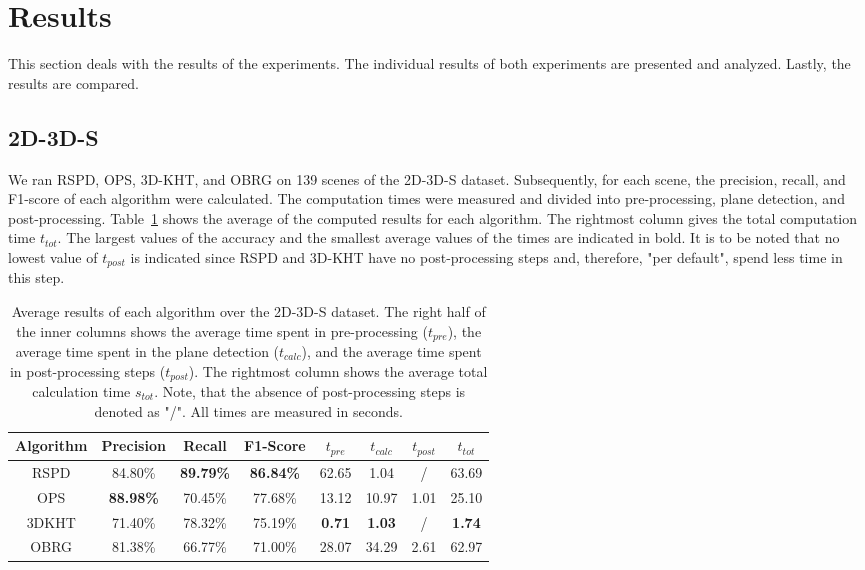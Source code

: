 \documentclass[main.tex]{subfiles}
\begin{document}
\section{Results}
This section deals with the results of the experiments.
The individual results of both experiments are presented and analyzed. Lastly, the results are compared.


\subsection{2D-3D-S}

We ran RSPD, OPS, 3D-KHT, and OBRG on 139 scenes of the 2D-3D-S dataset. Subsequently, for each scene, the precision, recall, and
F1-score of each algorithm were calculated. The computation times were measured and divided into pre-processing, plane detection,
and post-processing. Table~\ref{tab:res-3d2ds-total} shows the average of the computed results for each algorithm.
The rightmost column gives the total computation time $t_{tot}$. The largest values of the accuracy and the smallest average
values of the times are indicated in bold. It is to be noted that no lowest value of $t_{post}$ is indicated since RSPD and 3D-KHT
have no post-processing steps and, therefore, "per default", spend less time in this step.

\begin{table}[H]
    \centering
    \begin{tabular}{c|cccccc|c}
        Algorithm & Precision        & Recall           & F1-Score         & $t_{pre}$     & $t_{calc}$    & $t_{post}$ & $t_{tot}$     \\ \hline
        RSPD      & 84.80\%          & \textbf{89.79\%} & \textbf{86.84\%} & 62.65         & 1.04          & /          & 63.69         \\
        OPS       & \textbf{88.98\%} & 70.45\%          & 77.68\%          & 13.12         & 10.97         & 1.01       & 25.10         \\
        3DKHT     & 71.40\%          & 78.32\%          & 75.19\%          & \textbf{0.71} & \textbf{1.03} & /          & \textbf{1.74} \\
        OBRG      & 81.38\%          & 66.77\%          & 71.00\%          & 28.07         & 34.29         & 2.61       & 62.97
    \end{tabular}
    \caption[Overall 2D-3D-S Results]{Average results of each algorithm over the 2D-3D-S dataset. The right half of the inner columns shows the average time spent in
        pre-processing ($t_{pre}$), the average time spent in the plane detection ($t_{calc}$), and the average time spent in post-processing steps ($t_{post}$).
        The rightmost column shows the average total calculation time $s_{tot}$.
        Note, that the absence of post-processing steps is denoted as "/". All times are measured in seconds.}
    \label{tab:res-3d2ds-total}
\end{table}
\end{document}
